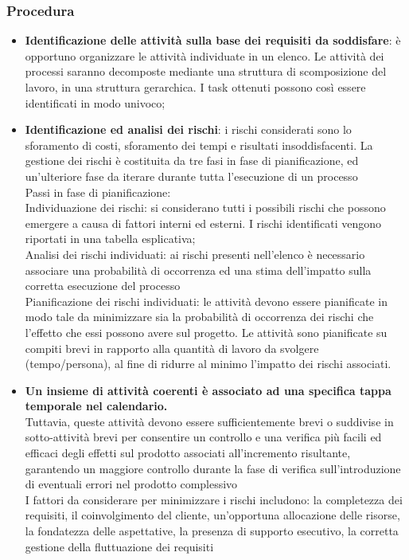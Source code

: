 \subsubsection{Procedura}
\begin{itemize}
    \item \textbf{Identificazione delle attività sulla base dei requisiti da soddisfare}: è opportuno organizzare le attività individuate in un elenco. Le attività dei processi saranno decomposte mediante una struttura di scomposizione del lavoro, in una struttura gerarchica. I task ottenuti possono così essere identificati in modo univoco;
    \item \textbf{Identificazione ed analisi dei rischi}: i rischi considerati sono lo sforamento di costi, sforamento dei tempi e risultati insoddisfacenti. La gestione dei rischi è costituita da tre fasi in fase di pianificazione, ed un'ulteriore fase da iterare durante tutta l'esecuzione di un processo \\
     Passi in fase di pianificazione: \\
     Individuazione dei rischi: si considerano tutti i possibili rischi che possono emergere a causa di fattori interni ed esterni. I rischi identificati vengono riportati in una tabella esplicativa; \\
     Analisi dei rischi individuati: ai rischi presenti nell'elenco è necessario associare una probabilità di occorrenza ed una stima dell'impatto sulla corretta esecuzione del processo \\
     Pianificazione dei rischi individuati: le attività devono essere pianificate in modo tale da minimizzare sia la probabilità di occorrenza dei rischi che l'effetto che essi possono avere sul progetto. Le attività sono pianificate su compiti brevi in rapporto alla quantità di lavoro da svolgere (tempo/persona), al fine di ridurre al minimo l'impatto dei rischi associati.
    \item \textbf{Un insieme di attività coerenti è associato ad una specifica tappa temporale nel calendario.}\\ Tuttavia, queste attività devono essere sufficientemente brevi o suddivise in sotto-attività brevi per consentire un controllo e una verifica più facili ed efficaci degli effetti sul prodotto associati all'incremento risultante, garantendo un maggiore controllo durante la fase di verifica sull'introduzione di eventuali errori nel prodotto complessivo \\ 
     I fattori da considerare per minimizzare i rischi includono: la completezza dei requisiti, il coinvolgimento del cliente, un'opportuna allocazione delle risorse, la fondatezza delle aspettative, la presenza di supporto esecutivo, la corretta gestione della fluttuazione dei requisiti\\

\end{itemize}
